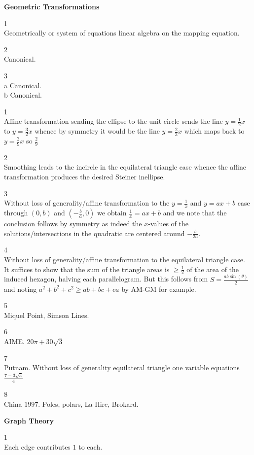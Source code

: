 \Large

\textbf{Geometric Transformations}

1 \\
Geometrically or system of equations linear algebra on the mapping equation.

2 \\
Canonical.

3 \\
a Canonical. \\
b Canonical.

1 \\
Affine transformation sending the ellipse to the unit circle sends the line $y=\frac{1}{2}x$ to $y=\frac{3}{2}x$ whence by symmetry it would be the line $y=\frac{2}{3}x$ which maps back to $y=\frac{2}{9}x$ so $\boxed{\frac{2}{9}}$

2 \\
Smoothing leads to the incircle in the equilateral triangle case whence the affine transformation produces the desired Steiner inellipse.

3 \\
Without loss of generality/affine transformation to the $y=\frac{1}{x}$ and $y=ax+b$ case through $(0,b)$ and $(-\frac{b}{a},0)$ we obtain $\frac{1}{x}=ax+b$ and we note that the conclusion follows by symmetry as indeed the $x$-values of the solutions/intersections in the quadratic are centered around $-\frac{b}{2a}$.

4 \\
Without loss of generality/affine transformation to the equilateral triangle case. It suffices to show that the sum of the triangle areas is $\ge \frac{1}{2}$ of the area of the induced hexagon, halving each parallelogram. But this follows from $S=\frac{ab\sin(\theta)}{2}$ and noting $a^2+b^2+c^2 \ge ab+bc+ca$ by AM-GM for example.

5 \\
Miquel Point, Simson Lines.

6 \\
AIME. $\boxed{20\pi +30\sqrt{3}}$

7 \\
Putnam. Without loss of generality equilateral triangle one variable equations $\boxed{\frac{7-3\sqrt{5}}{4}}$

8 \\
China 1997. Poles, polars, La Hire, Brokard.

\newpage

\textbf{Graph Theory}

1 \\
Each edge contributes $1$ to each.

